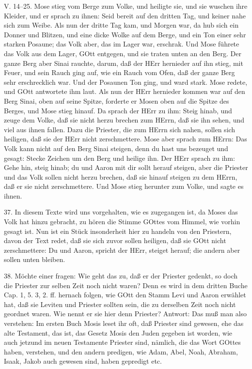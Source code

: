 \begin{schriftzitat}
V. 14–25. Mose stieg vom Berge zum Volke, und heiligte sie, und sie wuschen ihre Kleider, und er sprach zu ihnen: Seid bereit auf den dritten Tag, und keiner nahe sich zum Weibe. Als nun der dritte Tag kam, und Morgen war, da hub sich ein Donner und Blitzen, und eine dicke Wolke auf dem Berge, und ein Ton einer sehr starken Posaune; das Volk aber, das im Lager war, erschrak. Und Mose führete das Volk aus dem Lager, GOtt entgegen, und sie traten unten an den Berg. Der ganze Berg aber Sinai rauchte, darum, daß der HErr hernieder auf ihn stieg, mit Feuer, und sein Rauch ging auf, wie ein Rauch vom Ofen, daß der ganze Berg sehr erschrecklich war. Und der Posaunen Ton ging, und ward stark. Mose redete, und GOtt antwortete ihm laut. Als nun der HErr hernieder kommen war auf den Berg Sinai, oben auf seine Spitze, forderte er Mosen oben auf die Spitze des Berges, und Mose stieg hinauf. Da sprach der HErr zu ihm: Steig hinab, und zeuge dem Volke, daß sie nicht herzu brechen zum HErrn, daß sie ihn sehen, und viel aus ihnen fallen. Dazu die Priester, die zum HErrn sich nahen, sollen sich heiligen, daß sie der HErr nicht zerschmettere. Mose aber sprach zum HErrn: Das Volk kann nicht auf den Berg Sinai steigen, denn du hast uns bezeuget und gesagt: Stecke Zeichen um den Berg und heilige ihn. Der HErr sprach zu ihm: Gehe hin, steig hinab; du und Aaron mit dir sollt herauf steigen, aber die Priester und das Volk sollen nicht herzu brechen, daß sie hinauf steigen zu dem HErrn, daß er sie nicht zerschmettere. Und Mose stieg herunter zum Volke, und sagte es ihnen.
\end{schriftzitat}

37. In diesem Texte wird uns vorgehalten, wie es zugegangen ist, da Moses das Volk hat hinzu gebracht, zu hören die Stimme GOttes vom Himmel, wie vorhin gesagt ist. Nun ist ein Stück insonderheit hier zu handeln von den Priestern, davon der Text redet, daß sie sich zuvor sollen heiligen, daß sie GOtt nicht zerschmettere: Du und Aaron, spricht der HErr, steiget herauf; die andern aber sollen unten bleiben.

38. Möchte einer fragen: Wie geht das zu, daß er der Priester gedenkt, so doch die Priester zur selben Zeit noch nicht waren? Denn es wird in dem dritten Buche Cap. 1, 5. 3, 2. ff. hernach folgen, wie GOtt den Stamm Levi und Aaron erwählet hat, daß sie Leviten und Priester sollten sein, die zu derselben Zeit noch nicht geordnet waren. Wie nennt er sie hier denn Priester? Antwort: Das muß man also verstehen: Im ersten Buch Mosis leset ihr oft, daß Priester sind gewesen, ehe das alte Testament, das ist, das Gesetz Mosis den Juden gegeben ist worden, wie auch jetzund im neuen Testamente Priester sind, nämlich, die das Wort GOttes haben, verstehen, und den andern predigen, wie Adam, Abel, Noah, Abraham, Isaak, Jakob auch gewesen sind, haben gepredigt etc.

